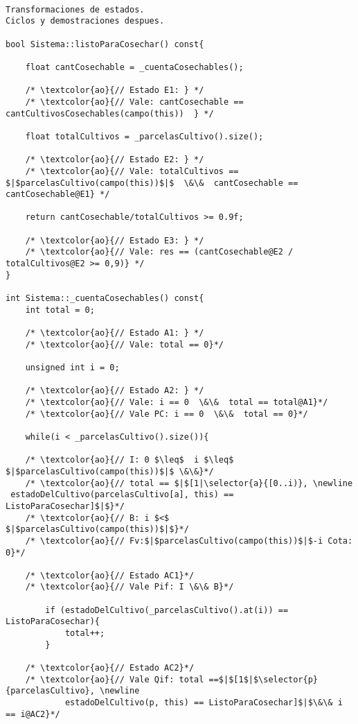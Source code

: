 \begin{lstlisting}

Transformaciones de estados.
Ciclos y demostraciones despues.

bool Sistema::listoParaCosechar() const{
     
    float cantCosechable = _cuentaCosechables();

	/* \textcolor{ao}{// Estado E1: } */
    /* \textcolor{ao}{// Vale: cantCosechable == cantCultivosCosechables(campo(this))  } */

    float totalCultivos = _parcelasCultivo().size();
    
    /* \textcolor{ao}{// Estado E2: } */
    /* \textcolor{ao}{// Vale: totalCultivos == $|$parcelasCultivo(campo(this))$|$  \&\&  cantCosechable == cantCosechable@E1} */
    
    return cantCosechable/totalCultivos >= 0.9f;
    
    /* \textcolor{ao}{// Estado E3: } */
    /* \textcolor{ao}{// Vale: res == (cantCosechable@E2 / totalCultivos@E2 >= 0,9)} */
}

int Sistema::_cuentaCosechables() const{
    int total = 0;
	
    /* \textcolor{ao}{// Estado A1: } */
    /* \textcolor{ao}{// Vale: total == 0}*/
    
    unsigned int i = 0;

    /* \textcolor{ao}{// Estado A2: } */
    /* \textcolor{ao}{// Vale: i == 0  \&\&  total == total@A1}*/
    /* \textcolor{ao}{// Vale PC: i == 0  \&\&  total == 0}*/
    
    while(i < _parcelasCultivo().size()){

    /* \textcolor{ao}{// I: 0 $\leq$  i $\leq$ $|$parcelasCultivo(campo(this))$|$ \&\&}*/
    /* \textcolor{ao}{// total == $|$[1|\selector{a}{[0..i)}, \newline
 estadoDelCultivo(parcelasCultivo[a], this) == ListoParaCosechar]$|$}*/
    /* \textcolor{ao}{// B: i $<$ $|$parcelasCultivo(campo(this))$|$}*/
    /* \textcolor{ao}{// Fv:$|$parcelasCultivo(campo(this))$|$-i Cota: 0}*/    	
    	
    /* \textcolor{ao}{// Estado AC1}*/
    /* \textcolor{ao}{// Vale Pif: I \&\& B}*/
    		
        if (estadoDelCultivo(_parcelasCultivo().at(i)) == ListoParaCosechar){
            total++;
        }

    /* \textcolor{ao}{// Estado AC2}*/
    /* \textcolor{ao}{// Vale Qif: total ==$|$[1$|$\selector{p}{parcelasCultivo}, \newline  
            estadoDelCultivo(p, this) == ListoParaCosechar]$|$\&\& i == i@AC2}*/


\end{lstlisting}
